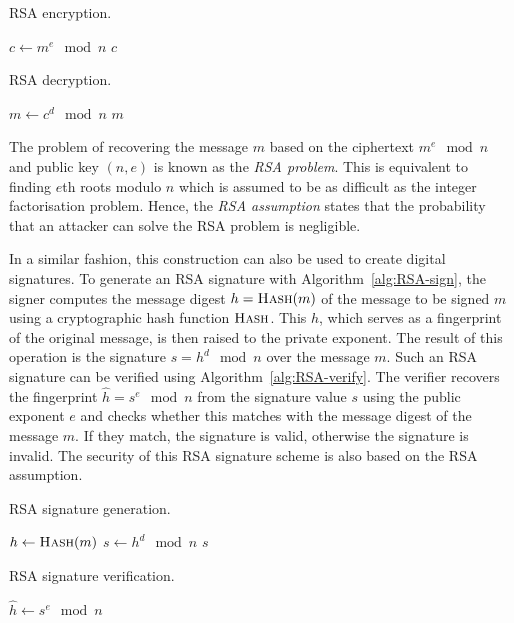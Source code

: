 \begin{algorithm}[ht]
  \caption{RSA encryption.}
  \label{alg:RSA-encrypt}
  \addtolength{\baselineskip}{1mm}
  \begin{algorithmic}[1]
      \State $c \gets m^e \mod n$
      \Return $c$
    \EndFunction
  \end{algorithmic}
\end{algorithm}
\begin{algorithm}[ht]
  \caption{RSA decryption.}
  \label{alg:RSA-decrypt}
  \addtolength{\baselineskip}{1mm}
  \begin{algorithmic}[1]
      \State $m \gets c^d \mod n$
      \Return $m$
    \EndFunction
  \end{algorithmic}
\end{algorithm}

The problem of recovering the message $m$ based on the ciphertext $m^e \mod n$
and public key $(n, e)$ is known as the \emph{RSA problem}. This is equivalent
to finding $e$th roots modulo $n$ which is assumed to be as difficult as the
integer factorisation problem. Hence, the \emph{RSA assumption} states that the
probability that an attacker can solve the RSA problem is negligible.

In a similar fashion, this construction can also be used to create digital
signatures. To generate an RSA signature with Algorithm~\ref{alg:RSA-sign}, the
signer computes the message digest $h = \Call{Hash}{m}$ of the message to be
signed $m$ using a cryptographic hash function $\Call{Hash}{}$. This $h$, which
serves as a fingerprint of the original message, is then raised to the private
exponent. The result of this operation is the signature $s = h^d \mod n$ over
the message $m$.
Such an RSA signature can be verified using Algorithm~\ref{alg:RSA-verify}. The
verifier recovers the fingerprint $\hat{h} = s^e \mod n$ from the signature
value $s$ using the public exponent $e$ and checks whether this matches with the
message digest of the message $m$. If they match, the signature is valid,
otherwise the signature is invalid. The security of this RSA signature scheme is
also based on the RSA assumption.

\begin{algorithm}[H]
  \caption{RSA signature generation.}
  \label{alg:RSA-sign}
  \addtolength{\baselineskip}{1mm}
  \begin{algorithmic}[1]
      \State $h \gets \Call{Hash}{m}$
      \State $s \gets h^d \mod n$
      \Return $s$
    \EndFunction
  \end{algorithmic}
\end{algorithm}
\begin{algorithm}[H]
  \caption{RSA signature verification.}
  \label{alg:RSA-verify}
  \addtolength{\baselineskip}{1mm}
  \begin{algorithmic}[1]
      \State $\hat{h} \gets s^e \mod n$
        \Return {}
      \EndIf
      \Return {}
    \EndFunction
  \end{algorithmic}
\end{algorithm}

